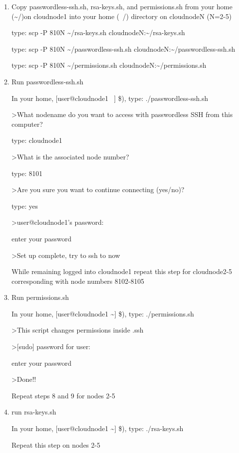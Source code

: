 \begin{enumerate}
\item Copy passwordless-ssh.sh, rsa-keys.sh, and permissions.sh from your home (\textasciitilde{}/)on cloudnode1 into your home (~/) directory on cloudnodeN (N=2-5)

type:  scp -P 810N \textasciitilde{}/rsa-keys.sh cloudnodeN:\textasciitilde{}/rsa-keys.sh

type:  scp -P 810N \textasciitilde{}/passwordless-ssh.sh cloudnodeN:\textasciitilde{}/passwordless-ssh.sh

type:  scp -P 810N \textasciitilde{}/permissions.sh cloudnodeN:\textasciitilde{}/permissions.sh\\


\item Run passwordless-ssh.sh

In your home, [user@cloudnode1 ~] \$), type:
./passwordless-ssh.sh

\textgreater What nodename do you want to access with passwordless SSH from this computer?

type: cloudnode1

\textgreater What is the associated node number?

type: 8101

\textgreater Are you sure you want to continue connecting (yes/no)?

type: yes

\textgreater user@cloudnode1's password:

enter your password

\textgreater Set up complete, try to ssh to now

While remaining logged into cloudnode1 repeat this step for cloudnode2-5 corresponding with node numbers 8102-8105\\


\item Run permissions.sh

In your home, [user@cloudnode1 \textasciitilde{}] \$), type:
./permissions.sh

\textgreater This script changes permissions inside .ssh

\textgreater [sudo] password for user:

enter your password

\textgreater Done!!

Repeat steps 8 and 9 for nodes 2-5\\


\item run rsa-keys.sh

In your home, [user@cloudnode1 \textasciitilde{}] \$), type:
./rsa-keys.sh

Repeat this step on nodes 2-5


\end{enumerate}
